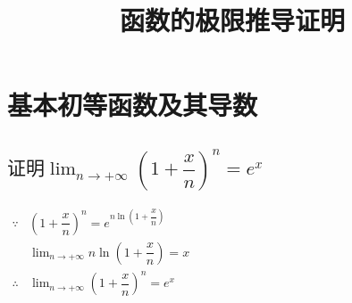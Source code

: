 \documentclass[a4paper, 12pt, draft]{article}
\title{函数的极限推导证明}
\author{}
\date{}
\begin{document}
\maketitle
\tableofcontents

\newpage
\section{基本初等函数及其导数}

    \subsection{$ \text{证明} \lim_{n \to + \infty } \left(1 + \dfrac{x}{n} \right)^{n} = e^x $}
    
    \begin{math}
        \begin{aligned}
            \because & \left( 1+\dfrac{x}{n} \right)^{n} = e^{n \ln{\left(1 + \dfrac{x}{n} \right)} } \\
            & \lim_{n \to +\infty} n \ln{\left(1 + \dfrac{x}{n} \right)} = x \\
            \therefore & \lim_{n \to + \infty } \left(1 + \dfrac{x}{n} \right)^{n} = e^x
        \end{aligned}
    \end{math}
    
\end{document}
